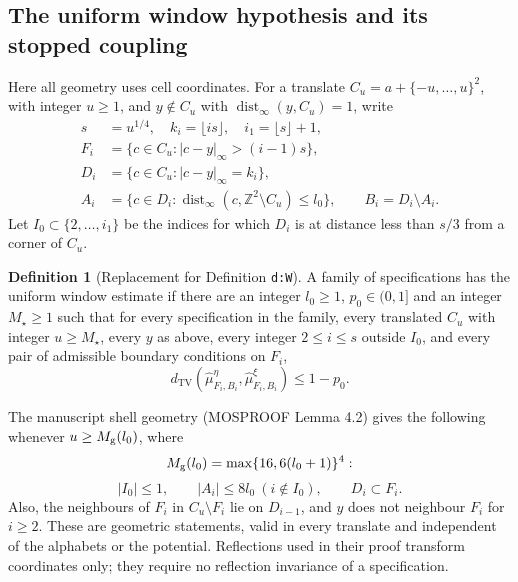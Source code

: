 \documentclass[11pt,reqno]{amsart}
\theoremstyle{definition}
\newtheorem{definition}[theorem]{Definition}
\newcommand{\Z}{\mathbb Z}
\newcommand{\TV}{d_{\mathrm{TV}}}
\newcommand{\dist}{\operatorname{dist}_\infty}
\begin{document}
\subsection{The uniform window hypothesis and its stopped coupling}

Here all geometry uses cell coordinates. For a translate
$C_u=a+\{-u,\ldots,u\}^2$, with integer $u\ge1$, and $y\notin C_u$
with $\dist(y,C_u)=1$, write
\begin{align*}
 s&=u^{1/4},\quad k_i=\lfloor is\rfloor,\quad i_1=\lfloor s\rfloor+1,\\
 F_i&=\{c\in C_u:|c-y|_\infty>(i-1)s\},\\
 D_i&=\{c\in C_u:|c-y|_\infty=k_i\},\\
 A_i&=\{c\in D_i:\dist(c,\Z^2\setminus C_u)\le l_0\},
 \qquad B_i=D_i\setminus A_i.
\end{align*}
Let $I_0\subset\{2,\ldots,i_1\}$ be the indices for which $D_i$ is
at distance less than $s/3$ from a corner of $C_u$.

\begin{definition}[Replacement for Definition \texttt{d:W}]\label{d:W}
A family of specifications has the uniform window estimate if there
are an integer $l_0\ge1$, $p_0\in(0,1]$ and an integer $M_\star\ge1$
such that for every specification in the family, every translated
$C_u$ with integer $u\ge M_\star$, every $y$ as above, every integer
$2\le i\le s$ outside $I_0$, and every pair of admissible boundary
conditions on $F_i$,
\begin{equation}\label{e:W}
 \TV(\widehat\mu_{F_i,B_i}^{\eta},
       \widehat\mu_{F_i,B_i}^{\xi})\le1-p_0.
\end{equation}
\end{definition}

The manuscript shell geometry (MOSPROOF Lemma 4.2) gives the following
whenever $u\ge M_{\rm g}(l_0)$, where
\[
 M_{\rm g}(l_0)=\max\{16,6(l_0+1)\}^4:
\]
\begin{equation}\label{e:shellfacts}
 |I_0|\le1,\qquad |A_i|\le8l_0\ (i\notin I_0),\qquad D_i\subset F_i.
\end{equation}
Also, the neighbours of $F_i$ in $C_u\setminus F_i$ lie on $D_{i-1}$,
and $y$ does not neighbour $F_i$ for $i\ge2$. These are geometric
statements, valid in every translate and independent of the alphabets
or the potential. Reflections used in their proof transform coordinates
only; they require no reflection invariance of a specification.
\end{document}
